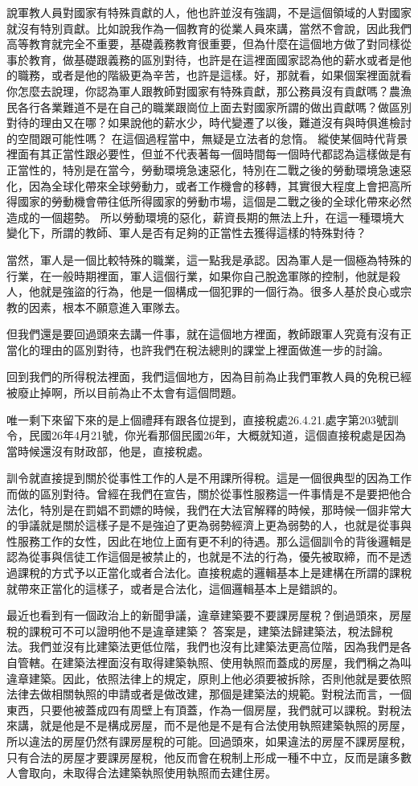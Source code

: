 \documentclass[]{ctexbook}
\begin{document}
說軍教人員對國家有特殊貢獻的人，他也許並沒有強調，不是這個領域的人對國家就沒有特別貢獻。比如說我作為一個教育的從業人員來講，當然不會說，因此我們高等教育就完全不重要，基礎義務教育很重要，但為什麼在這個地方做了對同樣從事於教育，做基礎跟義務的區別對待，也許是在這裡面國家認為他的薪水或者是他的職務，或者是他的階級更為辛苦，也許是這樣。好，那就看，如果個案裡面就看你怎麼去說理，你認為軍人跟教師對國家有特殊貢獻，那公務員沒有貢獻嗎？農漁民各行各業難道不是在自己的職業跟崗位上面去對國家所謂的做出貢獻嗎？做區別對待的理由又在哪？如果說他的薪水少，時代變遷了以後，難道沒有與時俱進檢討的空間跟可能性嗎？ 在這個過程當中，無疑是立法者的怠惰。
縱使某個時代背景裡面有其正當性跟必要性，但並不代表著每一個時間每一個時代都認為這樣做是有正當性的，特別是在當今，勞動環境急速惡化，特別在二戰之後的勞動環境急速惡化，因為全球化帶來全球勞動力，或者工作機會的移轉，其實很大程度上會把高所得國家的勞動機會帶往低所得國家的勞動市場，這個是二戰之後的全球化帶來必然造成的一個趨勢。
所以勞動環境的惡化，薪資長期的無法上升，在這一種環境大變化下，所謂的教師、軍人是否有足夠的正當性去獲得這樣的特殊對待？

當然，軍人是一個比較特殊的職業，這一點我是承認。因為軍人是一個極為特殊的行業，在一般時期裡面，軍人這個行業，如果你自己脫逸軍隊的控制，他就是殺人，他就是強盜的行為，他是一個構成一個犯罪的一個行為。很多人基於良心或宗教的因素，根本不願意進入軍隊去。

但我們還是要回過頭來去講一件事，就在這個地方裡面，教師跟軍人究竟有沒有正當化的理由的區別對待，也許我們在稅法總則的課堂上裡面做進一步的討論。

回到我們的所得稅法裡面，我們這個地方，因為目前為止我們軍教人員的免稅已經被廢止掉啊，所以目前為止不太會有這個問題。

唯一剩下來留下來的是上個禮拜有跟各位提到，直接稅處26.4.21.處字第203號訓令，民國26年4月21號，你光看那個民國26年，大概就知道，這個直接稅處是因為當時候還沒有財政部，他是，直接稅處。

訓令就直接提到關於從事性工作的人是不用課所得稅。這是一個很典型的因為工作而做的區別對待。曾經在我們在宣告，關於從事性服務這一件事情是不是要把他合法化，特別是在罰娼不罰嫖的時候，我們在大法官解釋的時候，那時候一個非常大的爭議就是關於這樣子是不是強迫了更為弱勢經濟上更為弱勢的人，也就是從事與性服務工作的女性，因此在地位上面有更不利的待遇。那么這個訓令的背後邏輯是認為從事與信徒工作這個是被禁止的，也就是不法的行為，優先被取締，而不是透過課稅的方式予以正當化或者合法化。直接稅處的邏輯基本上是建構在所謂的課稅就帶來正當化的這樣子，或者是合法化，這個邏輯基本上是錯誤的。

最近也看到有一個政治上的新聞爭議，違章建築要不要課房屋稅？倒過頭來，房屋稅的課稅可不可以證明他不是違章建築？ 答案是，建築法歸建築法，稅法歸稅法。我們並沒有比建築法更低位階，我們也沒有比建築法更高位階，因為我們是各自管轄。在建築法裡面沒有取得建築執照、使用執照而蓋成的房屋，我們稱之為叫違章建築。因此，依照法律上的規定，原則上他必須要被拆除，否則他就是要依照法律去做相關執照的申請或者是做改建，那個是建築法的規範。對稅法而言，一個東西，只要他被蓋成四有周壁上有頂蓋，作為一個房屋，我們就可以課稅。對稅法來講，就是他是不是構成房屋，而不是他是不是有合法使用執照建築執照的房屋，所以違法的房屋仍然有課房屋稅的可能。回過頭來，如果違法的房屋不課房屋稅，只有合法的房屋才要課房屋稅，他反而會在稅制上形成一種不中立，反而是讓多數人會取向，未取得合法建築執照使用執照而去建住房。
\end{document}
